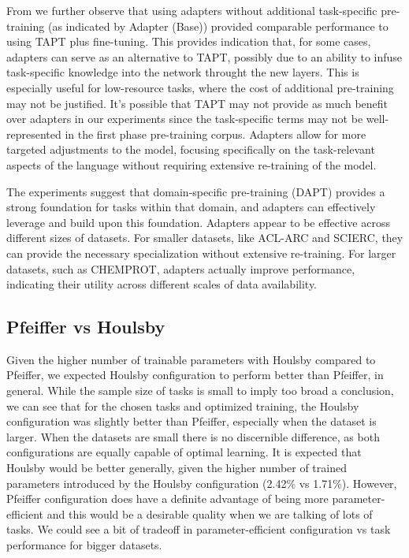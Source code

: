 \documentclass[10pt,twocolumn,letterpaper]{article}
\begin{document}
From  we further observe that using adapters without additional task-specific pre-training (as indicated by Adapter (Base)) provided comparable performance to using TAPT plus fine-tuning. This provides indication that, for some cases, adapters can serve as an alternative to TAPT, possibly due to an ability to infuse task-specific knowledge into the network throught the new layers. This is especially useful for low-resource tasks, where the cost of additional pre-training may not be justified. It's possible that TAPT may not provide as much benefit over adapters in our experiments since the task-specific terms may not be well-represented in the first phase pre-training corpus. Adapters allow for more targeted adjustments to the model, focusing specifically on the task-relevant aspects of the language without requiring extensive re-training of the model.



The experiments suggest that domain-specific pre-training (DAPT) provides a strong foundation for tasks within that domain, and adapters can effectively leverage and build upon this foundation. Adapters appear to be effective across different sizes of datasets. For smaller datasets, like ACL-ARC and SCIERC, they can provide the necessary specialization without extensive re-training. For larger datasets, such as CHEMPROT, adapters actually improve performance, indicating their utility across different scales of data availability.

\subsection{Pfeiffer vs Houlsby} 
Given the higher number of trainable parameters with Houlsby compared to Pfeiffer, we expected Houlsby configuration to perform better than Pfeiffer, in general. While the sample size of tasks is small to imply too broad a conclusion, we can see that for the chosen tasks and optimized training, the Houlsby configuration was slightly better than Pfeiffer, especially when the dataset is larger. When the datasets are small there is no discernible difference, as both configurations are equally capable of optimal learning. It is expected that Houlsby would be better generally, given the higher number of trained parameters introduced by the Houlsby configuration (2.42\% vs 1.71\%). However, Pfeiffer configuration does have a definite advantage of being more parameter-efficient and this would be a desirable quality when we are talking of lots of tasks. We could see a bit of tradeoff in parameter-efficient configuration vs task performance for bigger datasets.
\end{document}
